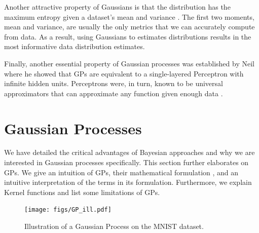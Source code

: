 \documentclass[letterpaper,11pt]{extarticle}
\begin{document}
Another attractive property of Gaussians is that the distribution has the maximum entropy given a dataset's mean and variance \cite{Murphy12}. The first two moments, mean and variance, are usually the only metrics that we can accurately compute from data. As a result, using Gaussians to estimates distributions results in the most informative data distribution estimates. 

Finally, another essential property of Gaussian processes was established by Neil \cite{Neal96} where he showed that GPs are equivalent to a single-layered Perceptron with infinite hidden units. Perceptrons were, in turn, known to be universal approximators that can approximate any function given enough data \cite{HornikSW89}.  

\section{Gaussian Processes}
We have detailed the critical advantages of Bayesian approaches and why we are interested in Gaussian processes specifically. This section further elaborates on GPs. We give an intuition of GPs, their mathematical formulation \cite{RasmussenW06, Murphy12}, and an intuitive interpretation of the terms in its formulation.  Furthermore, we explain Kernel functions and list some limitations of GPs. 

\begin{figure}[htp]
    \centering
    \texttt{[image: figs/GP\_ill.pdf]}
    \caption{Illustration of a Gaussian Process on the MNIST dataset.}
    \label{fig:mnist_gp}
\end{figure}
\end{document}
